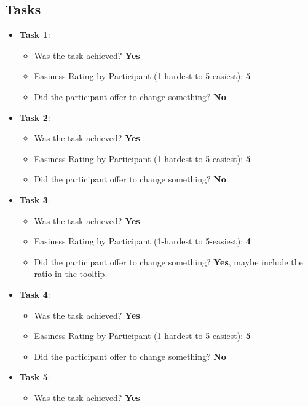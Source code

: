 \documentclass[twocolumn, letterpaper,13pt]{scrartcl}
\begin{document}
    \subsection*{Tasks}
    \begin{itemize}
        \item \textbf{Task 1}:
        \begin{itemize}
            \item Was the task achieved? \textbf{Yes}
            \item Easiness Rating by Participant (1-hardest to 5-easiest): \textbf{5}
            \item Did the participant offer to change something? \textbf{No}
        \end{itemize}
        \item \textbf{Task 2}:
        \begin{itemize}
            \item Was the task achieved? \textbf{Yes}
            \item Easiness Rating by Participant (1-hardest to 5-easiest): \textbf{5}
            \item Did the participant offer to change something? \textbf{No}
        \end{itemize}
        \item \textbf{Task 3}:
        \begin{itemize}
            \item Was the task achieved? \textbf{Yes}
            \item Easiness Rating by Participant (1-hardest to 5-easiest): \textbf{4}
            \item Did the participant offer to change something? \textbf{Yes}, maybe include the ratio in the tooltip.
        \end{itemize}
        \item \textbf{Task 4}:
        \begin{itemize}
            \item Was the task achieved? \textbf{Yes}
            \item Easiness Rating by Participant (1-hardest to 5-easiest): \textbf{5}
            \item Did the participant offer to change something? \textbf{No}
        \end{itemize}
        \item \textbf{Task 5}:
        \begin{itemize}
            \item Was the task achieved? \textbf{Yes}

\end{itemize}
\end{itemize}
\end{document}
